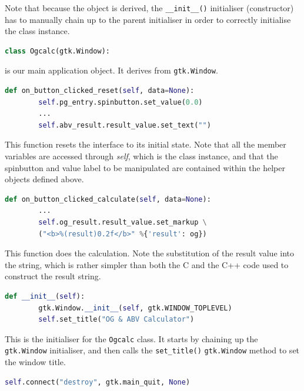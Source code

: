 \documentclass[a4paper,oneside]{article}
\newcommand{\variable}[1]{\textsl{#1}}
\newcommand{\class}[1]{\texttt{#1}}
\newcommand{\function}[1]{\texttt{#1()}}
\begin{document}
Note that because the object is derived, the \function{\_\_init\_\_}
initialiser (constructor) has to manually chain up to the parent
initialiser in order to correctly initialise the class instance.

\begin{lstlisting}[numbers=none, language=Python]
class Ogcalc(gtk.Window):
\end{lstlisting}

\noindent is our main application object.  It derives from
\class{gtk.Window}.

\begin{lstlisting}[numbers=none, language=Python]
    def on_button_clicked_reset(self, data=None):
        self.pg_entry.spinbutton.set_value(0.0)
        ...
        self.abv_result.result_value.set_text("")
\end{lstlisting}

This function resets the interface to its initial state.  Note that
all the member variables are accessed through \variable{self}, which
is the class instance, and that the spinbutton and value label to be
manipulated are contained within the helper objects defined above.

\begin{lstlisting}[numbers=none, language=Python]
    def on_button_clicked_calculate(self, data=None):
        ...
        self.og_result.result_value.set_markup \
        ("<b>%(result)0.2f</b>" %{'result': og})
\end{lstlisting}

This function does the calculation.  Note the substitution of the
result value into the string, which is rather simpler than both the C
and the C++ code used to construct the result string.

\begin{lstlisting}[numbers=none, language=Python]
    def __init__(self):
        gtk.Window.__init__(self, gtk.WINDOW_TOPLEVEL)
        self.set_title("OG & ABV Calculator")
\end{lstlisting}

This is the initialiser for the \class{Ogcalc} class.  It starts by
chaining up the \class{gtk.Window} initialiser, and then calls the
\function{set\_title} \class{gtk.Window} method to set the window
title.

\begin{lstlisting}[numbers=none, language=Python]
        self.connect("destroy", gtk.main_quit, None)
\end{lstlisting}
\end{document}

